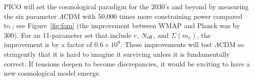 \documentclass[PICOAPC.tex]{subfiles}
\begin{document}
PICO will set the cosmological paradigm for the 2030's and beyond by measuring the six parameter $\Lambda$CDM with 50,000 times more constraining power compared to \planck ; see Figure~\ref{fig:fom} (the improvement between WMAP and Planck was by 300). For an 11-parameter set that include $r$, ${N_{\rm eff}}$, and $\Sigma (m_{\nu})$, the improvement is by a factor of $0.6\times10^{9}$. These improvements will test $\Lambda$CDM so stringently that it is hard to imagine it surviving unless it is fundamentally correct. If tensions deepen to become discrepancies, it would be exciting to have a new cosmological model emerge. 


\end{document}
